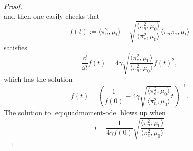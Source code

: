 \begin{proof}
\begin{equation}
\end{equation}
and then one easily checks that
\begin{equation}
    f(t) := \langle \pi_n^2, \mu_t\rangle
           + \sqrt{\frac{\langle \pi_n^2, \mu_0\rangle}
                        {\langle \pi_e^2, \mu_0\rangle}}
             \langle \pi_n \pi_e, \mu_t\rangle
\end{equation}
satisfies
\begin{equation*}
    \frac{\dd }{\dd t}f(t) = 4\gamma 
    \sqrt{\frac{\langle \pi_e^2, \mu_0\rangle}
                        {\langle \pi_n^2, \mu_0\rangle}}f(t)^2,
\end{equation*}
which has the solution
\begin{equation}\label{eq:quadmoment-ode}
    f(t) = \left(\frac{1}{f(0)} - 4\gamma 
    \sqrt{\frac{\langle \pi_e^2, \mu_0\rangle}
                        {\langle \pi_n^2, \mu_0\rangle}}t \right)^{-1}.
\end{equation}
The solution to \eqref{eq:quadmoment-ode} blows up when
\begin{equation}\label{eq:quad-tgel}
    t = \frac{1}{4\gamma f(0)}
             \sqrt{\frac{\langle \pi_n^2, \mu_0\rangle}
                        {\langle \pi_e^2, \mu_0\rangle}}
\end{equation}


\end{proof}
